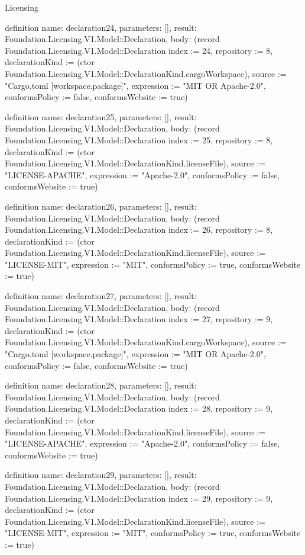 \begin{lexlean}{Licensing}
\begin{semanticmodule}
definition{
  name: declaration24,
  parameters: [],
  result: Foundation.Licensing.V1.Model::Declaration,
  body: (record Foundation.Licensing.V1.Model::Declaration {index := 24, repository := 8, declarationKind := (ctor Foundation.Licensing.V1.Model::DeclarationKind.cargoWorkspace), source := "Cargo.toml [workspace.package]", expression := "MIT OR Apache-2.0", conformsPolicy := false, conformsWebsite := true})
}

definition{
  name: declaration25,
  parameters: [],
  result: Foundation.Licensing.V1.Model::Declaration,
  body: (record Foundation.Licensing.V1.Model::Declaration {index := 25, repository := 8, declarationKind := (ctor Foundation.Licensing.V1.Model::DeclarationKind.licenseFile), source := "LICENSE-APACHE", expression := "Apache-2.0", conformsPolicy := false, conformsWebsite := true})
}

definition{
  name: declaration26,
  parameters: [],
  result: Foundation.Licensing.V1.Model::Declaration,
  body: (record Foundation.Licensing.V1.Model::Declaration {index := 26, repository := 8, declarationKind := (ctor Foundation.Licensing.V1.Model::DeclarationKind.licenseFile), source := "LICENSE-MIT", expression := "MIT", conformsPolicy := true, conformsWebsite := true})
}

definition{
  name: declaration27,
  parameters: [],
  result: Foundation.Licensing.V1.Model::Declaration,
  body: (record Foundation.Licensing.V1.Model::Declaration {index := 27, repository := 9, declarationKind := (ctor Foundation.Licensing.V1.Model::DeclarationKind.cargoWorkspace), source := "Cargo.toml [workspace.package]", expression := "MIT OR Apache-2.0", conformsPolicy := false, conformsWebsite := true})
}

definition{
  name: declaration28,
  parameters: [],
  result: Foundation.Licensing.V1.Model::Declaration,
  body: (record Foundation.Licensing.V1.Model::Declaration {index := 28, repository := 9, declarationKind := (ctor Foundation.Licensing.V1.Model::DeclarationKind.licenseFile), source := "LICENSE-APACHE", expression := "Apache-2.0", conformsPolicy := false, conformsWebsite := true})
}

definition{
  name: declaration29,
  parameters: [],
  result: Foundation.Licensing.V1.Model::Declaration,
  body: (record Foundation.Licensing.V1.Model::Declaration {index := 29, repository := 9, declarationKind := (ctor Foundation.Licensing.V1.Model::DeclarationKind.licenseFile), source := "LICENSE-MIT", expression := "MIT", conformsPolicy := true, conformsWebsite := true})
}


\end{semanticmodule}
\end{lexlean}
